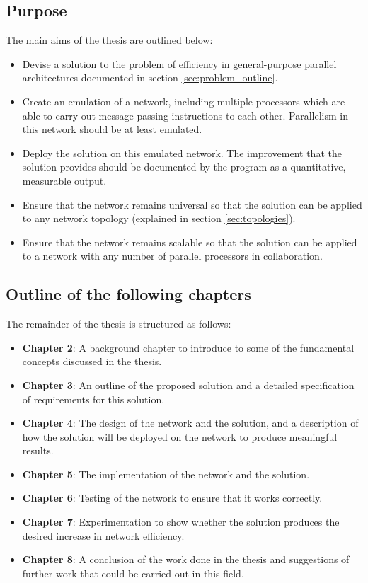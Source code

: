 \documentclass[a4paper, 12pt]{article}
\begin{document}
\subsection{Purpose}

The main aims of the thesis are outlined below:
\begin{itemize}
	\item Devise a solution to the problem of efficiency in general-purpose parallel architectures documented in section \ref{sec:problem_outline}.
	\item Create an emulation of a network, including multiple processors which are able to carry out message passing instructions to each other. Parallelism in this network should be at least emulated.
	\item Deploy the solution on this emulated network. The improvement that the solution provides should be documented by the program as a quantitative, measurable output.
	\item Ensure that the network remains universal so that the solution can be applied to any network topology (explained in section \ref{sec:topologies}).
	\item Ensure that the network remains scalable so that the solution can be applied to a network with any number of parallel processors in collaboration.
\end{itemize}

\subsection{Outline of the following chapters}

The remainder of the thesis is structured as follows:
\begin{itemize}[leftmargin=0cm]
	\item[] \textbf{Chapter 2}: A background chapter to introduce to some of the fundamental concepts discussed in the thesis.
	\item[] \textbf{Chapter 3}: An outline of the proposed solution and a detailed specification of requirements for this solution.
	\item[] \textbf{Chapter 4}: The design of the network and the solution, and a description of how the solution will be deployed on the network to produce meaningful results.
	\item[] \textbf{Chapter 5}: The implementation of the network and the solution.
	\item[] \textbf{Chapter 6}: Testing of the network to ensure that it works correctly.
	\item[] \textbf{Chapter 7}: Experimentation to show whether the solution produces the desired increase in network efficiency.
	\item[] \textbf{Chapter 8}: A conclusion of the work done in the thesis and suggestions of further work that could be carried out in this field.
\end{itemize}
\end{document}

